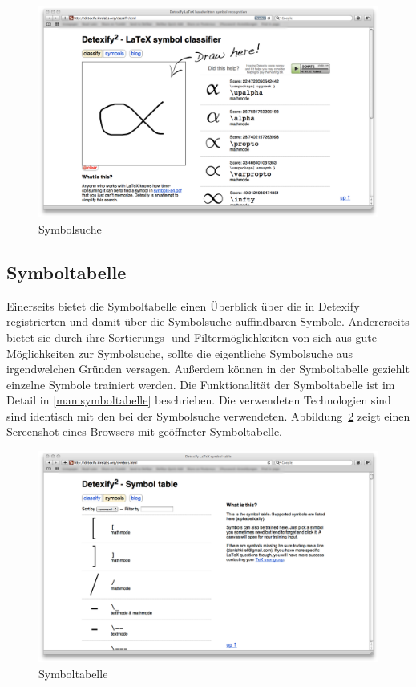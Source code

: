 \begin{figure}[htbp]
  \centering \includegraphics[width=\textwidth]{figures/interface-classify.png}
  \caption{Symbolsuche}
  \label{fig:symbolsuche}
\end{figure}


\subsection{Symboltabelle} %
\label{sub:symboltabelle}

Einerseits bietet die Symboltabelle einen Überblick über die in Detexify registrierten und damit über die Symbolsuche auffindbaren Symbole. Andererseits bietet sie durch ihre Sortierungs- und Filtermöglichkeiten von sich aus gute Möglichkeiten zur Symbolsuche, sollte die eigentliche Symbolsuche aus irgendwelchen Gründen versagen. Außerdem können in der Symboltabelle geziehlt einzelne Symbole trainiert werden. Die Funktionalität der Symboltabelle ist im Detail in \ref{man:symboltabelle} beschrieben. Die verwendeten Technologien sind sind identisch mit den bei der Symbolsuche verwendeten.
 Abbildung~\ref{fig:symboltabelle} zeigt einen Screenshot eines Browsers mit geöffneter Symboltabelle.

\begin{figure}[htbp]
  \centering \includegraphics[width=\textwidth]{figures/interface-symbol-table.png}
  \caption{Symboltabelle}
  \label{fig:symboltabelle}
\end{figure}

